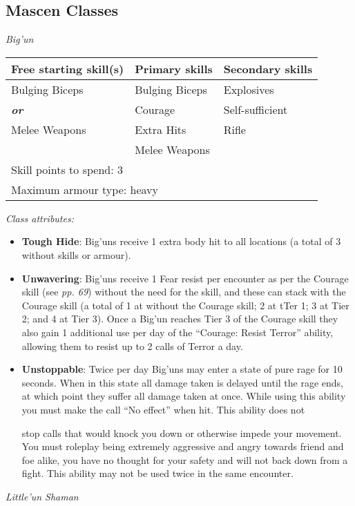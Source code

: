 \documentclass{scrbook}
\begin{document}
\subsection{Mascen Classes}

\textit{Big'un}

\begin{table}
\begin{tabular}{|l|l|l|} \hline 
Free starting skill(s) & Primary skills & Secondary skills \\
 \hline Bulging Biceps & Bulging Biceps & Explosives \\
 \hline \textbf{\textit{or}} & Courage & Self-sufficient \\
 \hline Melee Weapons & Extra Hits & Rifle \\
 \hline  & Melee Weapons &  \\
 \hline \multicolumn{3}{|l|}{Skill points to spend: 3} \\
 \hline \multicolumn{3}{|l|}{Maximum armour type: heavy} \\
 \hline \end{tabular}

\end{table}

\textit{Class attributes:}

\begin{itemize}
\item \textbf{Tough Hide}: Big'uns receive 1 extra body hit to all locations (a total of 3 without skills or armour).

\item \textbf{Unwavering}: Big'uns receive 1 Fear resist per encounter as per the Courage skill (see \textit{pp. 69}) without the need for the skill, and these can stack with the Courage skill (a total of 1 at without the Courage skill; 2 at tTer 1; 3 at Tier 2; and 4 at Tier 3). Once a Big'un reaches Tier 3 of the Courage skill they also gain 1 additional use per day of the ``Courage: Resist Terror'' ability, allowing them to resist up to 2 calls of Terror a day.

\item \textbf{Unstoppable}: Twice per day Big'uns may enter a state of pure rage for 10 seconds. When in this state all damage taken is delayed until the rage ends, at which point they suffer all damage taken at once. While using this ability you must make the call ``No effect'' when hit. This ability does not

stop calls that would knock you down or otherwise impede your movement. You must roleplay being extremely aggressive and angry towards friend and foe alike, you have no thought for your safety and will not back down from a fight. This ability may not be used twice in the same encounter.

\end{itemize}
\textit{Little'un Shaman}
\end{document}
